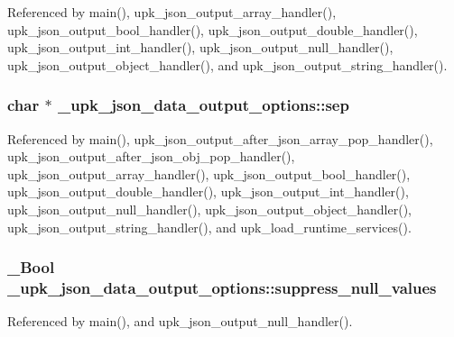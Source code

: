 Referenced by main(), upk\_\-json\_\-output\_\-array\_\-handler(), upk\_\-json\_\-output\_\-bool\_\-handler(), upk\_\-json\_\-output\_\-double\_\-handler(), upk\_\-json\_\-output\_\-int\_\-handler(), upk\_\-json\_\-output\_\-null\_\-handler(), upk\_\-json\_\-output\_\-object\_\-handler(), and upk\_\-json\_\-output\_\-string\_\-handler().

\subsubsection[{sep}]{\setlength{\rightskip}{0pt plus 5cm}char $\ast$ {\bf \_\-upk\_\-json\_\-data\_\-output\_\-options::sep}}\label{struct__upk__json__data__output__options_a6afab9cde92a9e076b39cf7c4b73b03b}


Referenced by main(), upk\_\-json\_\-output\_\-after\_\-json\_\-array\_\-pop\_\-handler(), upk\_\-json\_\-output\_\-after\_\-json\_\-obj\_\-pop\_\-handler(), upk\_\-json\_\-output\_\-array\_\-handler(), upk\_\-json\_\-output\_\-bool\_\-handler(), upk\_\-json\_\-output\_\-double\_\-handler(), upk\_\-json\_\-output\_\-int\_\-handler(), upk\_\-json\_\-output\_\-null\_\-handler(), upk\_\-json\_\-output\_\-object\_\-handler(), upk\_\-json\_\-output\_\-string\_\-handler(), and upk\_\-load\_\-runtime\_\-services().

\subsubsection[{suppress\_\-null\_\-values}]{\setlength{\rightskip}{0pt plus 5cm}\_\-Bool {\bf \_\-upk\_\-json\_\-data\_\-output\_\-options::suppress\_\-null\_\-values}}\label{struct__upk__json__data__output__options_a7bc38248c2f9f15c133780257817905e}


Referenced by main(), and upk\_\-json\_\-output\_\-null\_\-handler().

